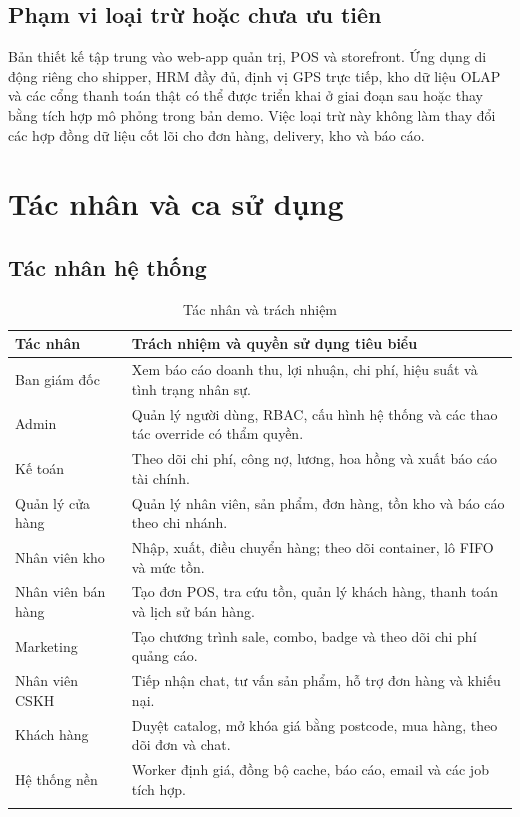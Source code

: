 \documentclass[12pt,a4paper]{report}
\begin{document}
\section{Phạm vi loại trừ hoặc chưa ưu tiên}
Bản thiết kế tập trung vào web-app quản trị, POS và storefront. Ứng dụng di động riêng cho shipper, HRM đầy đủ, định vị GPS trực tiếp, kho dữ liệu OLAP và các cổng thanh toán thật có thể được triển khai ở giai đoạn sau hoặc thay bằng tích hợp mô phỏng trong bản demo. Việc loại trừ này không làm thay đổi các hợp đồng dữ liệu cốt lõi cho đơn hàng, delivery, kho và báo cáo.

\chapter{Tác nhân và ca sử dụng}
\section{Tác nhân hệ thống}
\begin{longtable}{P{3.2cm}P{11.2cm}}
\toprule
Tác nhân & Trách nhiệm và quyền sử dụng tiêu biểu\\
\midrule
Ban giám đốc & Xem báo cáo doanh thu, lợi nhuận, chi phí, hiệu suất và tình trạng nhân sự.\\
Admin & Quản lý người dùng, RBAC, cấu hình hệ thống và các thao tác override có thẩm quyền.\\
Kế toán & Theo dõi chi phí, công nợ, lương, hoa hồng và xuất báo cáo tài chính.\\
Quản lý cửa hàng & Quản lý nhân viên, sản phẩm, đơn hàng, tồn kho và báo cáo theo chi nhánh.\\
Nhân viên kho & Nhập, xuất, điều chuyển hàng; theo dõi container, lô FIFO và mức tồn.\\
Nhân viên bán hàng & Tạo đơn POS, tra cứu tồn, quản lý khách hàng, thanh toán và lịch sử bán hàng.\\
Marketing & Tạo chương trình sale, combo, badge và theo dõi chi phí quảng cáo.\\
Nhân viên CSKH & Tiếp nhận chat, tư vấn sản phẩm, hỗ trợ đơn hàng và khiếu nại.\\
Khách hàng & Duyệt catalog, mở khóa giá bằng postcode, mua hàng, theo dõi đơn và chat.\\
Hệ thống nền & Worker định giá, đồng bộ cache, báo cáo, email và các job tích hợp.\\
\bottomrule
\caption{Tác nhân và trách nhiệm}\label{tab:actors}\\
\end{longtable}
\end{document}
